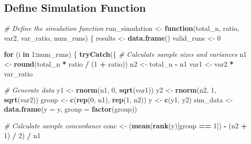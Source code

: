 \documentclass[
  letterpaper,
  DIV=11,
  numbers=noendperiod]{scrartcl}
\newenvironment{Shaded}{\begin{snugshade}}{\end{snugshade}}
\newcommand{\AttributeTok}[1]{\textcolor[rgb]{0.13,0.29,0.53}{#1}}
\newcommand{\CommentTok}[1]{\textcolor[rgb]{0.56,0.35,0.01}{\textit{#1}}}
\newcommand{\ControlFlowTok}[1]{\textcolor[rgb]{0.13,0.29,0.53}{\textbf{#1}}}
\newcommand{\DecValTok}[1]{\textcolor[rgb]{0.00,0.00,0.81}{#1}}
\newcommand{\FunctionTok}[1]{\textcolor[rgb]{0.13,0.29,0.53}{\textbf{#1}}}
\newcommand{\NormalTok}[1]{#1}
\newcommand{\OtherTok}[1]{\textcolor[rgb]{0.56,0.35,0.01}{#1}}
\newcommand{\SpecialCharTok}[1]{\textcolor[rgb]{0.81,0.36,0.00}{\textbf{#1}}}
\begin{document}
\subsection{Define Simulation
Function}\label{define-simulation-function}

\begin{Shaded}
\begin{Highlighting}[]
\CommentTok{\# Define the simulation function}
\NormalTok{run\_simulation }\OtherTok{\textless{}{-}} \ControlFlowTok{function}\NormalTok{(total\_n, ratio, var2, var\_ratio, num\_runs) \{}
\NormalTok{  results }\OtherTok{\textless{}{-}} \FunctionTok{data.frame}\NormalTok{()}
\NormalTok{  valid\_runs }\OtherTok{\textless{}{-}} \DecValTok{0}
  
  \ControlFlowTok{for}\NormalTok{ (i }\ControlFlowTok{in} \DecValTok{1}\SpecialCharTok{:}\NormalTok{num\_runs) \{}
    \FunctionTok{tryCatch}\NormalTok{(\{}
      \CommentTok{\# Calculate sample sizes and variances}
\NormalTok{      n1 }\OtherTok{\textless{}{-}} \FunctionTok{round}\NormalTok{(total\_n }\SpecialCharTok{*}\NormalTok{ ratio }\SpecialCharTok{/}\NormalTok{ (}\DecValTok{1} \SpecialCharTok{+}\NormalTok{ ratio))}
\NormalTok{      n2 }\OtherTok{\textless{}{-}}\NormalTok{ total\_n }\SpecialCharTok{{-}}\NormalTok{ n1}
\NormalTok{      var1 }\OtherTok{\textless{}{-}}\NormalTok{ var2 }\SpecialCharTok{*}\NormalTok{ var\_ratio}
      
      \CommentTok{\# Generate data}
\NormalTok{      y1 }\OtherTok{\textless{}{-}} \FunctionTok{rnorm}\NormalTok{(n1, }\DecValTok{0}\NormalTok{, }\FunctionTok{sqrt}\NormalTok{(var1))}
\NormalTok{      y2 }\OtherTok{\textless{}{-}} \FunctionTok{rnorm}\NormalTok{(n2, }\DecValTok{1}\NormalTok{, }\FunctionTok{sqrt}\NormalTok{(var2))}
\NormalTok{      group }\OtherTok{\textless{}{-}} \FunctionTok{c}\NormalTok{(}\FunctionTok{rep}\NormalTok{(}\DecValTok{0}\NormalTok{, n1), }\FunctionTok{rep}\NormalTok{(}\DecValTok{1}\NormalTok{, n2))}
\NormalTok{      y }\OtherTok{\textless{}{-}} \FunctionTok{c}\NormalTok{(y1, y2)}
\NormalTok{      sim\_data }\OtherTok{\textless{}{-}} \FunctionTok{data.frame}\NormalTok{(}\AttributeTok{y =}\NormalTok{ y, }\AttributeTok{group =} \FunctionTok{factor}\NormalTok{(group))}
      
      \CommentTok{\# Calculate sample concordance}
\NormalTok{      conc }\OtherTok{\textless{}{-}}\NormalTok{ (}\FunctionTok{mean}\NormalTok{(}\FunctionTok{rank}\NormalTok{(y)[group }\SpecialCharTok{==} \DecValTok{1}\NormalTok{]) }\SpecialCharTok{{-}}\NormalTok{ (n2 }\SpecialCharTok{+} \DecValTok{1}\NormalTok{) }\SpecialCharTok{/} \DecValTok{2}\NormalTok{) }\SpecialCharTok{/}\NormalTok{ n1}
      

\end{Highlighting}
\end{Shaded}
\end{document}
